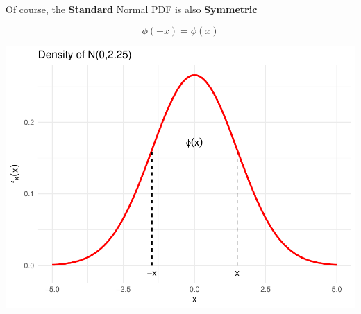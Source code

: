 \documentclass[smaller]{beamer}\usepackage[]{graphicx}\usepackage[]{color}
\newenvironment{knitrout}{}{} %
\begin{document}
\begin{frame}{\subsecname}
  
  Of course, the \textbf{Standard} Normal PDF is also \textbf{Symmetric}
  
  $$\phi(-x) = \phi(x)$$
\begin{knitrout}
\color{fgcolor}

{\centering \includegraphics[width=0.5\linewidth]{figure/unnamed-chunk-3-1} 

}



\end{knitrout}
\end{frame}
\end{document}
